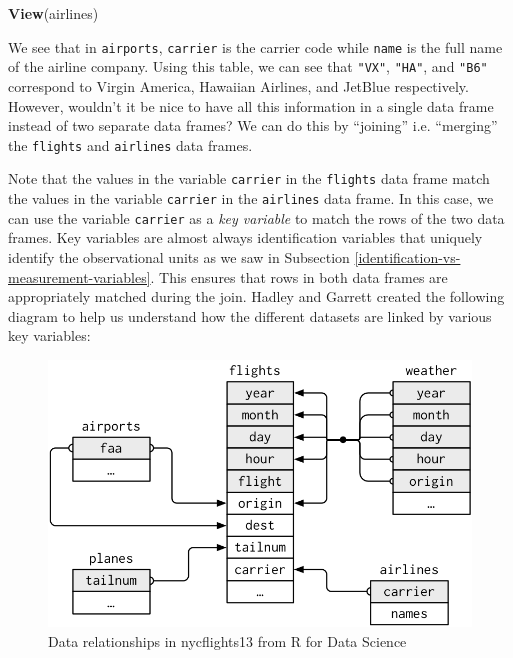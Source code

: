 \documentclass[12pt, krantz2,]{krantz}
\makeatletter
\newenvironment{Shaded}{\begin{snugshade}}{\end{snugshade}}
\newcommand{\KeywordTok}[1]{\textcolor[rgb]{0.27,0.27,0.27}{\textbf{#1}}}
\newcommand{\NormalTok}[1]{#1}
\newenvironment{kframe}{%
\medskip{}
\setlength{\fboxsep}{.8em}
 \def\at@end@of@kframe{}%
 \ifinner\ifhmode%
  \def\at@end@of@kframe{\end{minipage}}%
  \begin{minipage}{\columnwidth}%
 \fi\fi%
 \def\FrameCommand##1{\hskip\@totalleftmargin \hskip-\fboxsep
 \colorbox{shadecolor}{##1}\hskip-\fboxsep
     \hskip-\linewidth \hskip-\@totalleftmargin \hskip\columnwidth}%
 \MakeFramed {\advance\hsize-\width
   \@totalleftmargin\z@ \linewidth\hsize
   \@setminipage}}%
 {\par\unskip\endMakeFramed%
 \at@end@of@kframe}
\renewenvironment{Shaded}{\begin{kframe}}{\end{kframe}}
\makeatother
\begin{document}
\begin{Shaded}
\begin{Highlighting}[]
\KeywordTok{View}\NormalTok{(airlines)}
\end{Highlighting}
\end{Shaded}

We see that in \texttt{airports}, \texttt{carrier} is the carrier code while \texttt{name} is the full name of the airline company. Using this table, we can see that \texttt{"VX"}, \texttt{"HA"}, and \texttt{"B6"} correspond to Virgin America, Hawaiian Airlines, and JetBlue respectively. However, wouldn't it be nice to have all this information in a single data frame instead of two separate data frames? We can do this by ``joining'' i.e. ``merging'' the \texttt{flights} and \texttt{airlines} data frames.

Note that the values in the variable \texttt{carrier} in the \texttt{flights} data frame match the values in the variable \texttt{carrier} in the \texttt{airlines} data frame. In this case, we can use the variable \texttt{carrier} as a \emph{key variable} to match the rows of the two data frames. Key variables are almost always identification variables that uniquely identify the observational units as we saw in Subsection \ref{identification-vs-measurement-variables}. This ensures that rows in both data frames are appropriately matched during the join. Hadley and Garrett \citep{rds2016} created the following diagram to help us understand how the different datasets are linked by various key variables:

\begin{figure}

{\centering \includegraphics[width=\textwidth]{images/relational-nycflights} 

}

\caption{Data relationships in nycflights13 from R for Data Science}\label{fig:reldiagram}
\end{figure}
\end{document}
